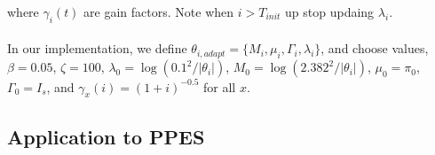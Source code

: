 \documentclass{article}
\begin{document}
 where $ \gamma_i(t)$ are gain factors. Note when $i > T_{init}$ up stop updaing $\lambda_i$.
 
 
\paragraph{}In our implementation, we define $\theta_{i, adapt} = \{M_i, \mu_i, \Gamma_i, \lambda_i\}$, and choose values, $\beta = 0.05$, $\zeta = 100$,  $\lambda_0 = \log(0.1^2/|\theta_i|)$, $M_0 = \log(2.382^2/|\theta_i|)$,  $\mu_0 = \pi_0$,  $\Gamma_0 = I_s$, and $\gamma_x(i) = (1 + i)^{-0.5}$ for all $x$. 


\subsection{Application to PPES}
\end{document}
